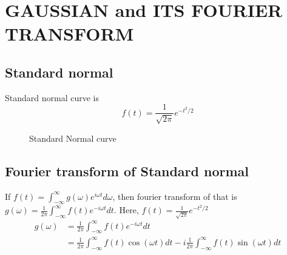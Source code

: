 \documentclass[11pt,a4paper]{article}
\author{Pritish Karmakar}
\begin{document}

\section{GAUSSIAN and ITS FOURIER TRANSFORM}

%


\subsection{Standard normal}
Standard normal curve is $$f(t)=\frac{1}{\sqrt{2\pi}}e^{-t^2 /2}$$

\begin{figure}[ht]
	\centering
	\scalebox{1}{}
	\caption{Standard Normal curve}
	\label{fig:gaussian}
\end{figure}


\subsection{Fourier transform of Standard normal}
If $f(t)=\int_{-\infty}^{\infty}g(\omega)e^{i\omega t} d\omega$, then fourier transform of that is $g(\omega)=\frac{1}{2\pi}\int_{-\infty}^{\infty}f(t)e^{-i\omega t} dt$. Here, $f(t)=\frac{1}{\sqrt{2\pi}}e^{-t^2 /2}$\\

\begin{align*}
	g(\omega)&=\frac{1}{2\pi}\int_{-\infty}^{\infty}f(t)e^{-i\omega t} dt\\
	&=\frac{1}{2\pi}\int_{-\infty}^{\infty}f(t)\cos(\omega t) dt - i \frac{1}{2\pi}\int_{-\infty}^{\infty}f(t)\sin(\omega t) dt
\end{align*}
\end{document}
